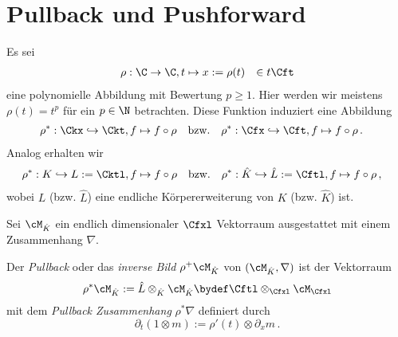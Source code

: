 \section{Pullback und Pushforward}
\begin{comment}
Nach \cite[1.a]{sabbah_Fourier-local} und \cite[1.3]{hotta2007d}.
\end{comment}
Es sei
\begin{align*}
\rho&:\C\rightarrow \C , t\mapsto x:=\rho(t) &\in t\Cft
\end{align*}
eine polynomielle Abbildung mit  Bewertung $p\geq1$.
Hier werden wir meistens $\rho(t)=t^p$ für ein $p\in \N$ betrachten. Diese
Funktion induziert eine Abbildung
\begin{align*}
\rho^*&:\Ckx\hookrightarrow \Ckt, f \mapsto f\circ \rho & \mbox{bzw.} &&
\rho^*&:\Cfx\hookrightarrow \Cft, f \mapsto f\circ \rho \,.
\end{align*}
Analog erhalten wir
\begin{align*}
\rho^*&:K\hookrightarrow L:=\Cktl, f \mapsto f\circ \rho & \mbox{bzw.} &&
\rho^*&:\hat K\hookrightarrow \hat L:=\Cftl, f \mapsto f\circ \rho \,,
\end{align*}
wobei $L$ (bzw. $\hat L$) eine endliche Körpererweiterung von $K$ (bzw. $\hat
K$) ist.
\begin{comment}
TODO: damit wird $\hat L$ zu einem $\hat K$ Vektorraum.
\end{comment}
\begin{comment}
TODO: $\nable$ zu $\partial_x$ ???? dann $\partial_t=\rho^*\partial_x$???
\end{comment}
Sei $\cM_{\hat K}$ ein endlich dimensionaler $\Cfxl$ Vektorraum ausgestattet mit
einem Zusammenhang $\nabla$.
%
\begin{defn}[Pullback] \label{defn:pull-back}
\begin{comment}
\cite[1.a]{sabbah_Fourier-local} und
\cite[Page 34]{sabbah_cimpa90}
\end{comment}
Der \emph{Pullback} oder das \emph{inverse Bild} $\rho^{+}\cM_{\hat K}$ von
$(\cM_{\hat K},\nabla)$ ist der Vektorraum
\[
\rho^{*}\cM_{\hat K}:=\hat L\otimes_{\hat K}\cM_{\hat K}
\bydef\Cftl\otimes_{\Cfxl}\cM_{\Cfxl}
\]
 mit dem \emph{Pullback Zusammenhang} $\rho^*\nabla$ definiert durch
\begin{equation} \label{eq:pull-back-zusammenhang}
\partial_t(1\otimes m):=\rho'(t)\otimes\partial_xm \,.
\end{equation}
\end{defn}
